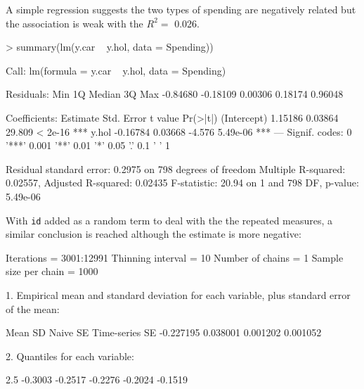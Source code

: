 \documentclass{article}
\begin{document}
A simple regression suggests the two types of spending are negatively related but the association is weak with the $R^{2}=$ 0.026.

\begin{Schunk}
\begin{Sinput}
> summary(lm(y.car ~ y.hol, data = Spending))
\end{Sinput}
\begin{Soutput}
Call:
lm(formula = y.car ~ y.hol, data = Spending)

Residuals:
     Min       1Q   Median       3Q      Max 
-0.84680 -0.18109  0.00306  0.18174  0.96048 

Coefficients:
            Estimate Std. Error t value Pr(>|t|)    
(Intercept)  1.15186    0.03864  29.809  < 2e-16 ***
y.hol       -0.16784    0.03668  -4.576 5.49e-06 ***
---
Signif. codes:  0 '***' 0.001 '**' 0.01 '*' 0.05 '.' 0.1 ' ' 1 

Residual standard error: 0.2975 on 798 degrees of freedom
Multiple R-squared: 0.02557,	Adjusted R-squared: 0.02435 
F-statistic: 20.94 on 1 and 798 DF,  p-value: 5.49e-06 
\end{Soutput}
\end{Schunk}

With \texttt{id} added as a random term to deal with the the repeated measures, a similar conclusion is reached although the estimate is more negative:

\iftalk
\else
\fi

\begin{Schunk}
\begin{Soutput}
Iterations = 3001:12991
Thinning interval = 10 
Number of chains = 1 
Sample size per chain = 1000 

1. Empirical mean and standard deviation for each variable,
   plus standard error of the mean:

          Mean             SD       Naive SE Time-series SE 
     -0.227195       0.038001       0.001202       0.001052 

2. Quantiles for each variable:

   2.5%
-0.3003 -0.2517 -0.2276 -0.2024 -0.1519 
\end{Soutput}
\end{Schunk}
\end{document}

